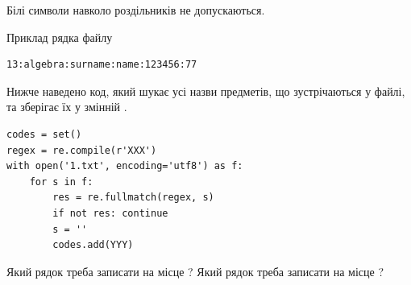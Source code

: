 \documentclass[12pt, ukrainian]{article}
\begin{document}
{Білі символи навколо роздільників не допускаються.

Приклад рядка файлу



\begin{verbatim}
13:algebra:surname:name:123456:77
\end{verbatim}


Нижче наведено код, який шукає усі назви предметів, що зустрічаються у файлі, та зберігає їх у змінній .



\begin{verbatim}
codes = set()
regex = re.compile(r'XXX')
with open('1.txt', encoding='utf8') as f:
    for s in f:
        res = re.fullmatch(regex, s)
        if not res: continue
        s = ''
        codes.add(YYY)
\end{verbatim}



Який рядок треба записати на місце  ?
Який рядок треба записати на місце  ?\par

}
\newpage
\end{document}
